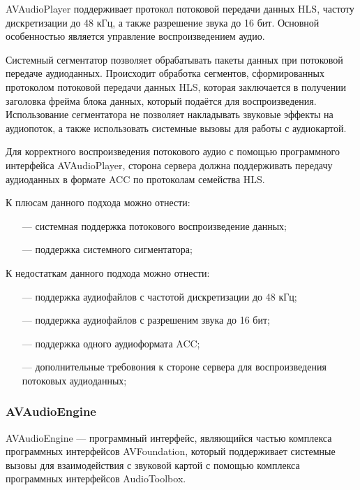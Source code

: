 		\par AVAudioPlayer поддерживает протокол потоковой передачи данных HLS, 
		частоту дискретизации до 48 кГц, а также разрешение звука до 16 бит.
		Основной особенностью является управление воспроизведением аудио.

		\par Системный сегментатор позволяет обрабатывать пакеты данных при потоковой передаче аудиоданных.
		Происходит обработка сегментов, сформированных протоколом потоковой передачи данных HLS,
		которая заключается в получении заголовка фрейма блока данных, который подаётся для воспроизведения.
		Использование сегментатора не позволяет накладывать звуковые эффекты на аудиопоток, 
		а также использовать системные вызовы для работы с аудиокартой.

		\par Для корректного воспроизведения потокового аудио с помощью программного интерфейса AVAudioPlayer,
		сторона сервера должна поддерживать передачу аудиоданных в формате ACC по протоколам семейства HLS.

		\par К плюсам данного подхода можно отнести:
		\begin{itemize}
			\item[---] системная поддержка потокового воспроизведение данных;
			\item[---] поддержка системного сигментатора; 
		\end{itemize}

		\par К недостаткам данного подхода можно отнести:
		\begin{itemize}
			\item[---] поддержка аудиофайлов с частотой дискретизации до 48 кГц;
			\item[---] поддержка аудиофайлов с разрешеним звука до 16 бит;
			\item[---] поддержка одного аудиоформата ACC;
			\item[---] дополнительные требовония к стороне сервера для воспроизведения потоковых аудиоданных; 
		\end{itemize}

	\subsubsection{AVAudioEngine}
		\par AVAudioEngine \cite{avengine} --- программный интерфейс, являющийся частью комплекса программных интерфейсов AVFoundation, 
		который поддерживает системные вызовы для взаимодействия с звуковой картой с помощью комплекса программных интерфейсов AudioToolbox.

